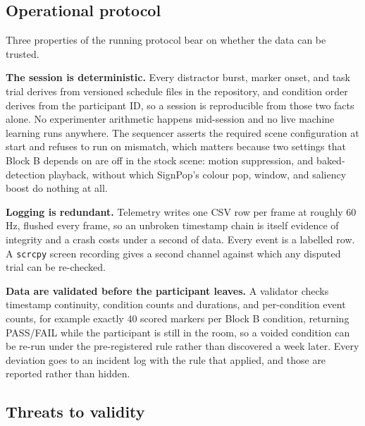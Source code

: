 \subsection{Operational protocol}

Three properties of the running protocol bear on whether the data can be trusted.

\textbf{The session is deterministic.} Every distractor burst, marker onset, and task trial derives
from versioned schedule files in the repository, and condition order derives from the participant ID,
so a session is reproducible from those two facts alone. No experimenter arithmetic happens
mid-session and no live machine learning runs anywhere. The sequencer asserts the required scene
configuration at start and refuses to run on mismatch, which matters because two settings that Block
B depends on are off in the stock scene: motion suppression, and baked-detection playback, without
which SignPop's colour pop, window, and saliency boost do nothing at all.

\textbf{Logging is redundant.} Telemetry writes one CSV row per frame at roughly 60 Hz, flushed every
frame, so an unbroken timestamp chain is itself evidence of integrity and a crash costs under a
second of data. Every event is a labelled row. A \verb|scrcpy| screen recording gives a second channel
against which any disputed trial can be re-checked.

\textbf{Data are validated before the participant leaves.} A validator checks timestamp continuity,
condition counts and durations, and per-condition event counts, for example exactly 40 scored markers
per Block B condition, returning PASS/FAIL while the participant is still in the room, so a voided
condition can be re-run under the pre-registered rule rather than discovered a week later. Every
deviation goes to an incident log with the rule that applied, and those are reported rather than
hidden.

\subsection{Threats to validity}

